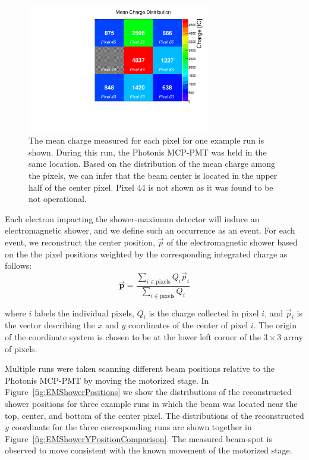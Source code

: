 \begin{figure}[htbp] 
\centering
\includegraphics[width=8cm]{Images/exavint/exintrun30.pdf} 
\caption{\small The mean charge measured for each pixel for one example run is shown. During this run, the Photonis MCP-PMT was held in the same location. Based on the distribution
of the mean charge among the pixels, we can infer that the beam center is
located in the upper half of the center pixel. Pixel 44 is not shown as it was
found to be not operational. } 
\label{fig:exavint} 
\end{figure} 

Each electron impacting the shower-maximum detector will induce an
electromagnetic shower, and we define such an occurrence as an event. For each
event, we reconstruct the center position, $\vec{p}$ of the electromagnetic
shower based on the the pixel positions weighted by the corresponding integrated
charge as follows: 
\begin{equation} 
 \vec{\mathbf{{p}}} =
\frac{\sum_{i\in\mathrm{pixels}} Q_{i} \vec{p}_i} {\sum_{i\in\mathrm{pixels}}
Q_{i}} 
\end{equation} 

where $i$ labels the individual pixels, $Q_{i}$ is the charge collected in pixel
$i$, and $\vec{p}_{i}$ is the vector describing the $x$ and $y$ coordinates of
the center of pixel $i$. The origin of the coordinate system is chosen to be at
the lower left corner of the $3\times3$ array of pixels.

Multiple runs were taken scanning different beam positions relative to the
Photonis MCP-PMT by moving the motorized stage. In
Figure~\ref{fig:EMShowerPositions} we show the distributions of the
reconstructed shower positions for three example runs in which the beam was
located near the top, center, and bottom of the center pixel. The distributions
of the reconstructed $y$ coordinate for the three corresponding runs are shown
together in Figure~\ref{fig:EMShowerYPositionComparison}. The measured beam-spot
is observed to move consistent with the known movement of the motorized stage.

